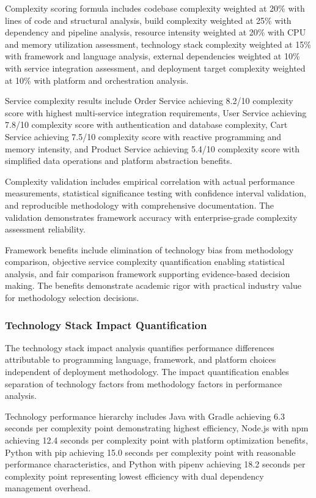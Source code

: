 Complexity scoring formula includes codebase complexity weighted at 20\% with lines of code and structural analysis, build complexity weighted at 25\% with dependency and pipeline analysis, resource intensity weighted at 20\% with CPU and memory utilization assessment, technology stack complexity weighted at 15\% with framework and language analysis, external dependencies weighted at 10\% with service integration assessment, and deployment target complexity weighted at 10\% with platform and orchestration analysis.

Service complexity results include Order Service achieving 8.2/10 complexity score with highest multi-service integration requirements, User Service achieving 7.8/10 complexity score with authentication and database complexity, Cart Service achieving 7.5/10 complexity score with reactive programming and memory intensity, and Product Service achieving 5.4/10 complexity score with simplified data operations and platform abstraction benefits.

Complexity validation includes empirical correlation with actual performance measurements, statistical significance testing with confidence interval validation, and reproducible methodology with comprehensive documentation. The validation demonstrates framework accuracy with enterprise-grade complexity assessment reliability.

Framework benefits include elimination of technology bias from methodology comparison, objective service complexity quantification enabling statistical analysis, and fair comparison framework supporting evidence-based decision making. The benefits demonstrate academic rigor with practical industry value for methodology selection decisions.

\subsubsection{Technology Stack Impact Quantification}

The technology stack impact analysis quantifies performance differences attributable to programming language, framework, and platform choices independent of deployment methodology. The impact quantification enables separation of technology factors from methodology factors in performance analysis.

Technology performance hierarchy includes Java with Gradle achieving 6.3 seconds per complexity point demonstrating highest efficiency, Node.js with npm achieving 12.4 seconds per complexity point with platform optimization benefits, Python with pip achieving 15.0 seconds per complexity point with reasonable performance characteristics, and Python with pipenv achieving 18.2 seconds per complexity point representing lowest efficiency with dual dependency management overhead.

